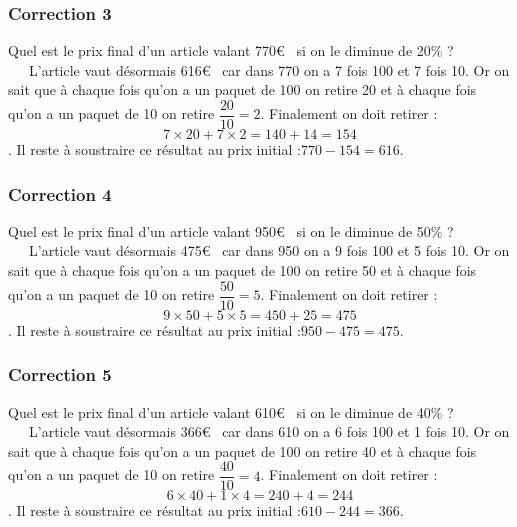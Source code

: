 \documentclass[15pt, mathserif]{beamer}
\begin{document}
\begin{frame}
\vspace{-10mm}
	\frametitle{Correction 3}
Quel est le prix final d'un article valant 770\euro ~ si on le diminue de 20\% ? \\ ~~\ L'article vaut désormais 616\euro ~ car dans 770 on a 7 fois 100 et 7 fois 10. Or on sait que à chaque fois qu'on a un paquet de 100 on retire 20 et à chaque fois qu'on a un paquet de 10 on retire $\dfrac{20}{10}=2$. Finalement on doit retirer : $$7\times 20 + 7\times2 = 140+14=154$$. Il reste à soustraire ce résultat au prix initial :$770-154=616$.\end{frame}


\begin{frame}
\vspace{-10mm}
	\frametitle{Correction 4}
Quel est le prix final d'un article valant 950\euro ~ si on le diminue de 50\% ? \\ ~~\ L'article vaut désormais 475\euro ~ car dans 950 on a 9 fois 100 et 5 fois 10. Or on sait que à chaque fois qu'on a un paquet de 100 on retire 50 et à chaque fois qu'on a un paquet de 10 on retire $\dfrac{50}{10}=5$. Finalement on doit retirer : $$9\times 50 + 5\times5 = 450+25=475$$. Il reste à soustraire ce résultat au prix initial :$950-475=475$.\end{frame}


\begin{frame}
\vspace{-10mm}
	\frametitle{Correction 5}
Quel est le prix final d'un article valant 610\euro ~ si on le diminue de 40\% ? \\ ~~\ L'article vaut désormais 366\euro ~ car dans 610 on a 6 fois 100 et 1 fois 10. Or on sait que à chaque fois qu'on a un paquet de 100 on retire 40 et à chaque fois qu'on a un paquet de 10 on retire $\dfrac{40}{10}=4$. Finalement on doit retirer : $$6\times 40 + 1\times4 = 240+4=244$$. Il reste à soustraire ce résultat au prix initial :$610-244=366$.\end{frame}
\end{document}
